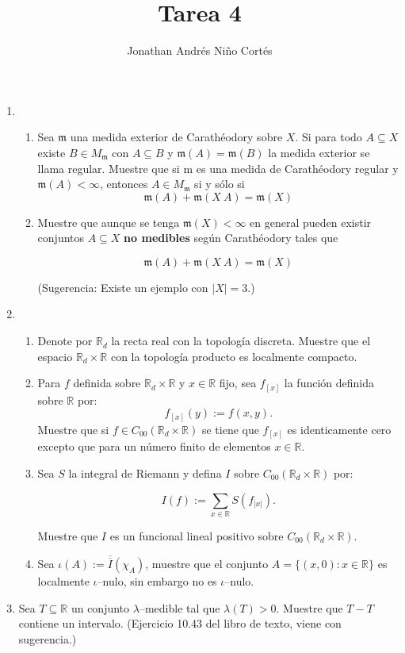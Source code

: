 \documentclass[letter,twoside,12pt]{article}
\title{Tarea 4}
\author{Jonathan Andrés Niño Cortés}
\begin{document}
\maketitle

\begin{enumerate}[label = (\textbf{\arabic*.})]

\item \begin{enumerate}[label = (\textbf{\roman*.})]
\item Sea $ \mathfrak{m} $ una medida exterior de Carathéodory sobre $ X $. Si para todo $ A \subseteq X $ existe $ B \in M_\mathfrak{m} $ con $ A \subseteq B $ y $ \mathfrak{m}(A) = \mathfrak{m}(B) $ la medida exterior se llama regular. Muestre que si m es una medida de Carathéodory regular y $ \mathfrak{m}(A) < \infty $, entonces $ A \in M_\mathfrak{m} $ si y sólo si
$$ \mathfrak{m}(A) + \mathfrak{m}(X \ A) = \mathfrak{m}(X) $$

\item Muestre que aunque se tenga $ \mathfrak{m}(X) < \infty $ en general pueden existir conjuntos $ A \subseteq X $ \textbf{no medibles} según Carathéodory tales que

$$ \mathfrak{m}(A) + \mathfrak{m}(X \ A) = \mathfrak{m}(X) $$

(Sugerencia: Existe un ejemplo con $ |X| = 3 $.)
\end{enumerate}

\item \begin{enumerate}[label = (\textbf{\roman*.})]
\item Denote por $ \mathbb{R}_d $ la recta real con la topología discreta. Muestre que el espacio $\mathbb{R}_d \times \mathbb{R}  $ con la topología producto es localmente compacto.

\item Para $ f $ definida sobre $ \mathbb{R}_d \times \mathbb{R} $ y $ x \in \mathbb{R} $ fijo, sea $ f_{[x]} $ la función definida sobre $ \mathbb{R} $ por:
$$ f_{[x]}(y):=f(x,y). $$
Muestre que si $ f \in C_{00}(\mathbb{R}_d \times \mathbb{R}) $ se tiene que $ f_{[x]} $ es identicamente cero excepto que para un número finito de elementos $ x \in \mathbb{R} $.

\item Sea $ S $ la integral de Riemann y defina $ I $ sobre $ C_{00}(\mathbb{R}_d \times \mathbb{R}) $ por:

$$ I(f) := \sum_{x \in \mathbb{R}}S(f_{|x|}). $$

Muestre que $ I $ es un funcional lineal positivo sobre $ C_{00}(\mathbb{R}_d \times \mathbb{R}) $.

\item Sea $ \iota(A)  := \overline{\overline{I}}(\chi_A) $, muestre que el conjunto $ A = \{(x,0) : x \in \mathbb{R}\} $ es localmente $ \iota $–nulo, sin embargo no es $ \iota $–nulo.
\end{enumerate}

\item Sea $ T \subseteq \mathbb{R} $ un conjunto $ \lambda $–medible tal que $ \lambda(T) > 0 $. Muestre que $ T-T $ contiene un intervalo. (Ejercicio 10.43 del libro de texto, viene con sugerencia.)
\end{enumerate}
\end{document}
